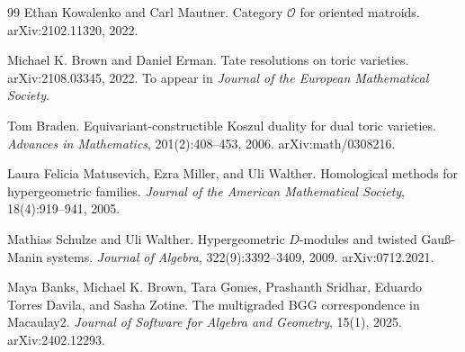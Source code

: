 \documentclass[11pt]{article}
\theoremstyle{definition}
\theoremstyle{plain}
\theoremstyle{remark}
\numberwithin{equation}{section}
\begin{document}
\begin{thebibliography}{99}
Ethan Kowalenko and Carl Mautner.
\newblock Category $\mathcal O$ for oriented matroids.
\newblock arXiv:2102.11320, 2022.

Michael K. Brown and Daniel Erman.
\newblock Tate resolutions on toric varieties.
\newblock arXiv:2108.03345, 2022. To appear in \emph{Journal of the European Mathematical Society}.

Tom Braden.
\newblock Equivariant-constructible Koszul duality for dual toric varieties.
\newblock \emph{Advances in Mathematics}, 201(2):408--453, 2006. arXiv:math/0308216.

Laura Felicia Matusevich, Ezra Miller, and Uli Walther.
\newblock Homological methods for hypergeometric families.
\newblock \emph{Journal of the American Mathematical Society}, 18(4):919--941, 2005.

Mathias Schulze and Uli Walther.
\newblock Hypergeometric $D$-modules and twisted Gau\ss-Manin systems.
\newblock \emph{Journal of Algebra}, 322(9):3392--3409, 2009. arXiv:0712.2021.

Maya Banks, Michael K. Brown, Tara Gomes, Prashanth Sridhar, Eduardo Torres Davila, and Sasha Zotine.
\newblock The multigraded BGG correspondence in Macaulay2.
\newblock \emph{Journal of Software for Algebra and Geometry}, 15(1), 2025. arXiv:2402.12293.

\end{thebibliography}
\end{document}
